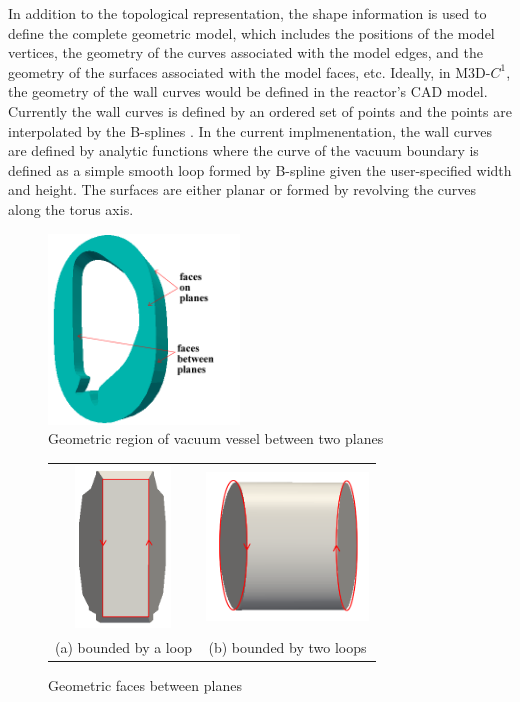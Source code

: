 \documentclass[11pt]{article}  %
\begin{document}
In addition to the topological representation, the shape information is used to define the complete geometric model, which includes the positions of the model vertices, the geometry of the curves associated with the model edges, and the geometry of the surfaces associated with the model faces, etc. Ideally, in M3D-$C^1$, the geometry of the wall curves would be defined in the reactor's CAD model. Currently the wall curves is defined by an ordered set of points and the points are interpolated by the B-splines \cite{prautzsch2002bezier}. In the current implmenentation, the wall curves are defined by analytic functions where the curve of the vacuum boundary is defined as a simple smooth loop formed by B-spline given the user-specified width and height. The surfaces are either planar or formed by revolving the curves along the torus axis.
\begin{figure}
\center
\includegraphics[width=2in]{fig/vacuumGeoRegionFace.png}
\caption{\small{Geometric region of vacuum vessel between two planes}}
\label{fig:regiontopo}
\end{figure}

\begin{figure}
\center
\begin{tabular}{cc}
\includegraphics[width=1in]{fig/facebtw1.png}&\includegraphics[width=1.7in]{fig/facebtw2.png}\\
\small{(a) bounded by a loop}&\small{(b) bounded by two loops}\\
\end{tabular}
\caption{\small{Geometric faces between planes}}
\label{fig:facetopobtw}
\end{figure}
\end{document}
